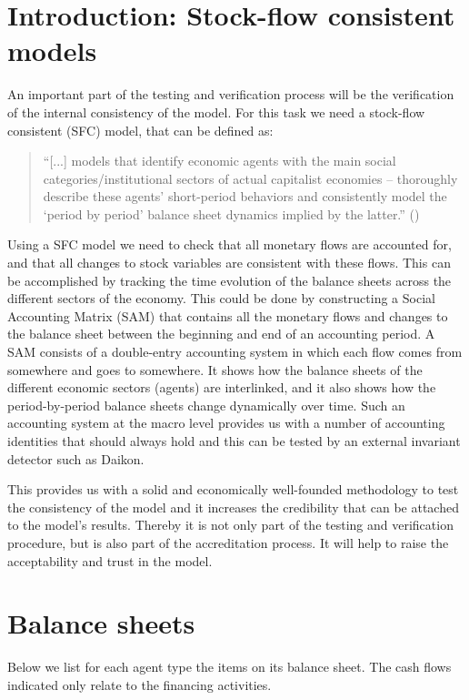 
\section{Introduction: Stock-flow consistent models}
An important part of the testing and verification process will be the verification of the internal consistency of the model. For this task we need a stock-flow consistent (SFC) model, that can be defined as:
\begin{quote}
``[...] models that identify economic agents with the main social categories/institutional sectors of actual capitalist economies -- thoroughly describe these agents' short-period behaviors and consistently model the `period by period' balance sheet dynamics implied by the latter.'' (\citet[p. 2]{Macedo-e-Silva:2008})
\end{quote}
Using a SFC model we need to check that all monetary flows are accounted for, and that all changes to stock variables are consistent with these flows. This can be accomplished by tracking the time evolution of the balance sheets across the different sectors of the economy. This could be done by constructing a Social Accounting Matrix (SAM) that contains all the monetary flows and changes to the balance sheet between the beginning and end of an accounting period. A SAM consists of a double-entry accounting system in which each flow comes from somewhere and goes to somewhere. It shows how the balance sheets of the different economic sectors (agents) are interlinked, and it also shows how the period-by-period balance sheets change dynamically over time. Such an accounting system at the macro level provides us with a number of accounting identities that should always hold and this can be tested by an external invariant detector such as Daikon.

This provides us with a solid and economically well-founded methodology to test the consistency of the model and it increases the credibility that can be attached to the model's results. Thereby it is not only part of the testing and verification procedure, but is also part of the accreditation process. It will help to raise the acceptability and trust in the model.

\section{Balance sheets}
Below we list for each agent type the items on its balance sheet. The cash flows indicated only relate to the financing activities.

